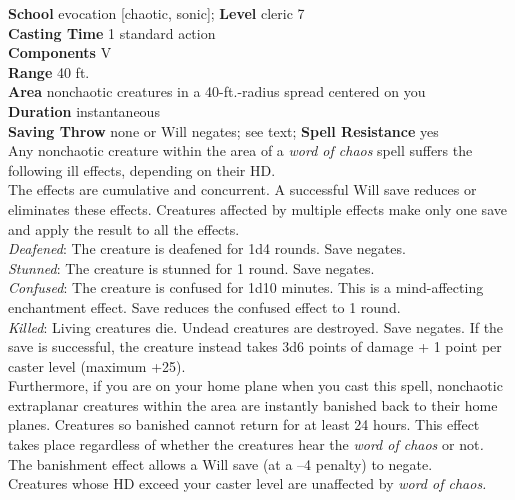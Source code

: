 \textbf{School} evocation [chaotic, sonic]; \textbf{Level} cleric 7\\
\textbf{Casting Time} 1 standard action\\
\textbf{Components} V\\
\textbf{Range} 40 ft.\\
\textbf{Area} nonchaotic creatures in a 40-ft.-radius spread centered on you\\
\textbf{Duration} instantaneous\\
\textbf{Saving Throw} none or Will negates; see text; \textbf{Spell Resistance} yes\\
Any nonchaotic creature within the area of a \textit{word of chaos }spell suffers the following ill effects, depending on their HD.\\
The effects are cumulative and concurrent. A successful Will save reduces or eliminates these effects. Creatures affected by multiple effects make only one save and apply the result to all the effects.\\
\textit{Deafened}: The creature is deafened for 1d4 rounds. Save negates.\\
\textit{Stunned}: The creature is stunned for 1 round. Save negates.\\
\textit{Confused}: The creature is confused for 1d10 minutes. This is a mind-affecting enchantment effect. Save reduces the confused effect to 1 round.\\
\textit{Killed}: Living creatures die. Undead creatures are destroyed. Save negates. If the save is successful, the creature instead takes 3d6 points of damage + 1 point per caster level (maximum +25).\\
Furthermore, if you are on your home plane when you cast this spell, nonchaotic extraplanar creatures within the area are instantly banished back to their home planes. Creatures so banished cannot return for at least 24 hours. This effect takes place regardless of whether the creatures hear the \textit{word of chaos }or not\textit{. }The banishment effect allows a Will save (at a --4 penalty) to negate.\\
Creatures whose HD exceed your caster level are unaffected by \textit{word of chaos.}\\
